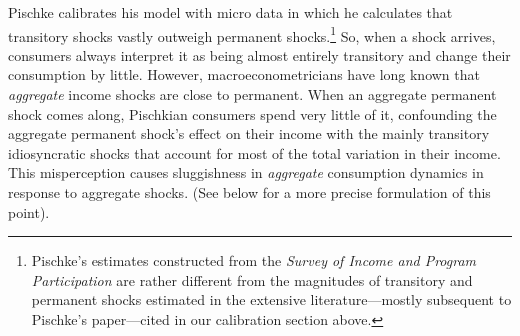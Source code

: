 \documentclass[titlepage]{\econtex}\newcommand{\texname}{cAndCwithStickyE}
\begin{document}
Pischke calibrates his model with micro data in which he calculates that transitory shocks vastly outweigh permanent shocks.\footnote{Pischke's estimates constructed from the {\it Survey of Income and Program Participation} are rather different from the magnitudes of transitory and permanent shocks estimated in the extensive literature---mostly subsequent to Pischke's paper---cited in our calibration section above.}  So, when a shock arrives, consumers always interpret it as being almost entirely transitory and change their consumption by little.  However, macroeconometricians have long known that {\it aggregate} income shocks are close to permanent.  When an aggregate permanent shock comes along, Pischkian consumers spend very little of it, confounding the aggregate permanent shock's effect on their income with the mainly transitory idiosyncratic shocks that account for most of the total variation in their income.  This misperception causes sluggishness in {\it aggregate} consumption dynamics in response to aggregate shocks.  (See below for a more precise formulation of this point).
\end{document}
